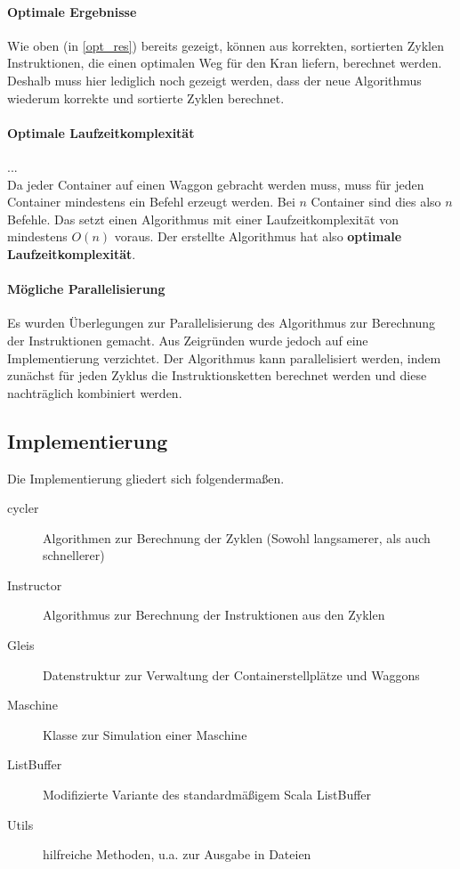 \paragraph{Optimale Ergebnisse}
Wie oben (in \ref{opt_res}) bereits gezeigt, können aus korrekten, sortierten Zyklen Instruktionen, die einen optimalen Weg für den Kran liefern, berechnet werden.
Deshalb muss hier lediglich noch gezeigt werden, dass der neue Algorithmus wiederum korrekte und sortierte Zyklen berechnet. \\

\paragraph{Optimale Laufzeitkomplexität}
... \\
Da jeder Container auf einen Waggon gebracht werden muss, muss für jeden Container mindestens ein Befehl erzeugt werden.
Bei $n$ Container sind dies also $n$ Befehle. Das setzt einen Algorithmus mit einer Laufzeitkomplexität von mindestens $O(n)$ voraus.
Der erstellte Algorithmus hat also \textbf{optimale Laufzeitkomplexität}.

\paragraph{Mögliche Parallelisierung}
Es wurden Überlegungen zur Parallelisierung des Algorithmus zur Berechnung der Instruktionen gemacht.
Aus Zeigründen wurde jedoch auf eine Implementierung verzichtet.
Der Algorithmus kann parallelisiert werden,
indem zunächst für jeden Zyklus die Instruktionsketten berechnet werden und diese nachträglich kombiniert werden.

\subsection{Implementierung}
Die Implementierung gliedert sich folgendermaßen.
\begin{description}
 \item[cycler] Algorithmen zur Berechnung der Zyklen (Sowohl langsamerer, als auch schnellerer)
 \item[Instructor] Algorithmus zur Berechnung der Instruktionen aus den Zyklen
 \item[Gleis] Datenstruktur zur Verwaltung der Containerstellplätze und Waggons
 \item[Maschine] Klasse zur Simulation einer Maschine
 \item[ListBuffer] Modifizierte Variante des standardmäßigem Scala ListBuffer
 \item[Utils] hilfreiche Methoden, u.a. zur Ausgabe in Dateien
\end{description}

